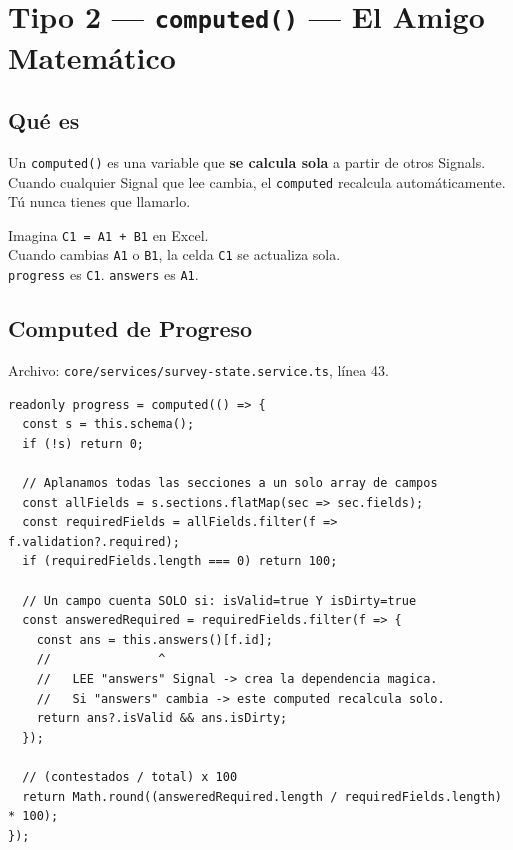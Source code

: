 \documentclass[12pt, a4paper]{article}
\begin{document}
\section{  Tipo 2 — \texttt{computed()} — El Amigo Matemático}

\subsection{ Qué es}
Un \texttt{computed()} es una variable que \textbf{se calcula sola} a partir de
otros Signals. Cuando cualquier Signal que lee cambia, el \texttt{computed}
recalcula automáticamente. Tú nunca tienes que llamarlo.

\begin{tcolorbox}[analogia, title={\emoji{memo} \emoji{abacus} Celda de Excel con Fórmula}]
  Imagina \texttt{C1 = A1 + B1} en Excel.\\
  Cuando cambias \texttt{A1} o \texttt{B1}, la celda \texttt{C1} se actualiza sola.\\[0.3cm]
   \texttt{progress} es \texttt{C1}. \quad \texttt{answers} es \texttt{A1}.
\end{tcolorbox}

\subsection{ Computed de Progreso}
Archivo: \textcolor{morado}{\texttt{core/services/survey-state.service.ts}}, línea 43.

\begin{lstlisting}
readonly progress = computed(() => {
  const s = this.schema();
  if (!s) return 0;

  // Aplanamos todas las secciones a un solo array de campos
  const allFields = s.sections.flatMap(sec => sec.fields);
  const requiredFields = allFields.filter(f => f.validation?.required);
  if (requiredFields.length === 0) return 100;

  // Un campo cuenta SOLO si: isValid=true Y isDirty=true
  const answeredRequired = requiredFields.filter(f => {
    const ans = this.answers()[f.id];
    //               ^
    //   LEE "answers" Signal -> crea la dependencia magica.
    //   Si "answers" cambia -> este computed recalcula solo.
    return ans?.isValid && ans.isDirty;
  });

  // (contestados / total) x 100
  return Math.round((answeredRequired.length / requiredFields.length) * 100);
});
\end{lstlisting}
\end{document}
